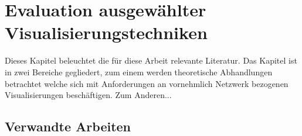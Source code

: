 \documentclass[draft=false
              ,paper=a4
              ,twoside=false
              ,fontsize=11pt
              ,headsepline
              ,BCOR10mm
              ,DIV11
              ]{scrbook}
\newcommand{\TODO}[1]{\colorbox{yellow}{\textcolor{red}{[TODO: #1]}}}
\begin{document}
\chapter{Evaluation ausgewählter Visualisierungstechniken} %
\label{cha:evaluation_ausgewählter_visualisierungstechniken}

Dieses Kapitel beleuchtet die für diese Arbeit relevante Literatur. Das Kapitel ist in zwei Bereiche gegliedert, zum einem werden theoretische Abhandlungen betrachtet welche sich mit Anforderungen an vornehmlich Netzwerk bezogenen Visualisierungen beschäftigen. Zum Anderen...

\section{Verwandte Arbeiten} %
\label{sec:verwandte_arbeiten}
%
\end{document}
